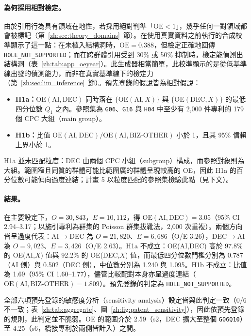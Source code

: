 \paragraph{為何採用相對檢定。} 由於引用行為具有領域在地性，若採用絕對判準「$\mathrm{OE} < 1$」，幾乎任何一對領域都會被標記（第~\ref{zh:sec:theory_domains}~節）。在使用真實資料之前執行的合成校準顯示了這一點：在未植入結構洞時，$\mathrm{OE} = 0.388$，但檢定正確地回傳 \texttt{HOLE\_\allowbreak NOT\_\allowbreak SUPPORTED}；而在跨群體引用受到 30\% 或 50\% 抑制時，檢定能偵測出結構洞（表~\ref{zh:tab:app_oeyear}）。此生成器相當簡單，此校準顯示的是從低基準線出發的偵測能力，而非在真實基準線下的檢定力（第~\ref{zh:sec:lim_inference}~節）。預先登錄的假說皆為相對假說：
\begin{itemize}
  \item \textbf{H1a：}$\mathrm{OE}(\mathrm{AI},\mathrm{DEC})$ 同時落在 $\{\mathrm{OE}(\mathrm{AI},X)\}$ 與 $\{\mathrm{OE}(\mathrm{DEC},X)\}$ 的最低四分位數 $Q_1$ 之內。參照集為 \texttt{G06}、\texttt{G16} 與 \texttt{H04} 中至少有 2,000 件專利的 179 個 CPC 大組（main group）。
  \item \textbf{H1b：}比值 $\mathrm{OE}(\mathrm{AI},\mathrm{DEC}) / \mathrm{OE}(\mathrm{AI},\mathrm{BIZ\text{-}OTHER})$ 小於 1，且其 95\% 信賴上界小於 1。
\end{itemize}
H1a 並未匹配粒度：DEC 由兩個 CPC 小組（subgroup）構成，而參照對象則為大組。範圍窄且同質的群體可能比範圍廣的群體呈現較高的 OE，因此 H1a 的百分位數可能偏向過度連結；計畫 5 以粒度匹配的參照集檢驗此點（見下文）。

\paragraph{結果。} 在主要設定下，$O = 30{,}843$，$E = 10{,}112$，得 $\mathrm{OE}(\mathrm{AI},\mathrm{DEC}) = 3.05$（95\% CI 2.94--3.17；以施引專利為群集的 Poisson 群集拔靴法，2,000 次重複）。兩個方向皆呈過度代表：AI$\rightarrow$DEC 為 $O = 21{,}820$、$E = 6{,}686$（O/E 3.26），DEC$\rightarrow$AI 為 $O = 9{,}023$、$E = 3{,}426$（O/E 2.63）。H1a 不成立：OE(AI,DEC) 高於 97.8\% 的 OE(AI,$X$) 值與 92.2\% 的 OE(DEC,$X$) 值，而最低四分位數門檻分別為 0.787（AI 側）與 0.502（DEC 側），中位數分別為 1.240 與 1.095。H1b 不成立：比值為 1.69（95\% CI 1.60--1.77），儘管比較配對本身亦呈過度連結（$\mathrm{OE}(\mathrm{AI},\mathrm{BIZ\text{-}OTHER}) = 1.809$）。預先登錄的判定為 \texttt{HOLE\_\allowbreak NOT\_\allowbreak SUPPORTED}。

全部六項預先登錄的敏感度分析（sensitivity analysis）設定皆與此判定一致（0/6 不一致；表~\ref{zh:tab:aggregate}、圖~\ref{zh:fig:patent_sensitivity}），因此依預先登錄的規則，此判定並不脆弱。OE 的範圍介於 2.59（s2，DEC 擴大至整個 \texttt{G06Q10}）至 4.25（s6，橋接專利於兩側皆計入）之間。

